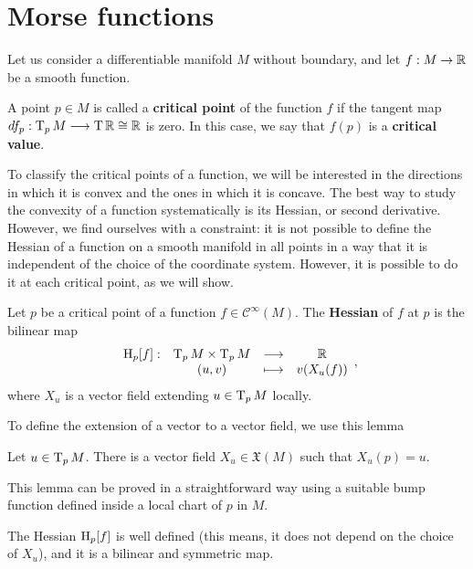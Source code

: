 \section{Morse functions} \label{section:morse_functions}

Let us consider a differentiable manifold $M$ without boundary, and let $f : M \rightarrow \mathbb{R}$ be a smooth function.

\begin{deff}
	A point $p \in M$ is called a {\bf critical point} of the function $f$ if the tangent map $df_p : \operatorname T_pM \longrightarrow \operatorname T\mathbb{R} \cong \mathbb{R}$ is zero. In this case, we say that $f(p)$ is a {\bf critical value}.
\end{deff}

To classify the critical points of a function, we will be interested in the directions in which it is convex and the ones in which it is concave. The best way to study the convexity of a function systematically is its Hessian, or second derivative. However, we find ourselves with a constraint: it is not possible to define the Hessian of a function on a smooth manifold in all points in a way that it is independent of the choice of the coordinate system. However, it is possible to do it at each critical point, as we will show.

\begin{deff}
	Let $p$ be a critical point of a function $f \in \mathcal{C}^{\infty}(M)$. The {\bf Hessian} of $f$ at $p$ is the bilinear map
\[\begin{array}{rccc} \operatorname H_p[f] : & \operatorname T_pM \times \operatorname T_pM & \longrightarrow & \mathbb{R} \\ & (u,v) & \longmapsto & v(X_u(f)) \end{array} ,\]
where $X_u$ is a vector field extending $u \in \operatorname T_pM$ locally.
\end{deff}

To define the extension of a vector to a vector field, we use this lemma

\begin{lema}
	Let $u \in \operatorname T_pM$. There is a vector field $X_u \in \mathfrak{X}(M)$ such that $X_u(p) = u$.
\end{lema}

This lemma can be proved in a straightforward way using a suitable bump function defined inside a local chart of $p$ in $M$.

\begin{lema}
	The Hessian $\operatorname H_p[f]$ is well defined (this means, it does not depend on the choice of $X_u$), and it is a bilinear and symmetric map.
\end{lema}

